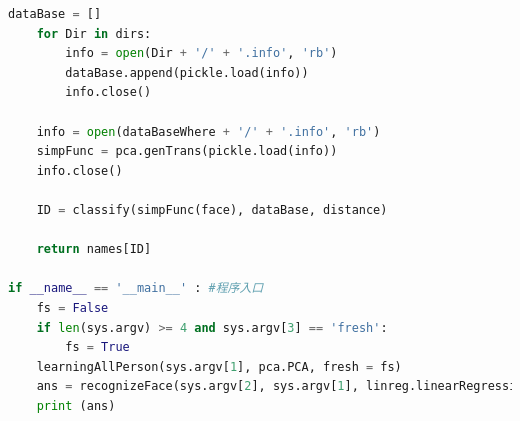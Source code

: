 \documentclass[fleqn,10pt]{SelfArx} %
\begin{document}
\begin{lstlisting}[language=python]
    dataBase = []
    for Dir in dirs:
        info = open(Dir + '/' + '.info', 'rb')
        dataBase.append(pickle.load(info))
        info.close()

    info = open(dataBaseWhere + '/' + '.info', 'rb')
    simpFunc = pca.genTrans(pickle.load(info))
    info.close()

    ID = classify(simpFunc(face), dataBase, distance)

    return names[ID]

if __name__ == '__main__' : #程序入口
    fs = False
    if len(sys.argv) >= 4 and sys.argv[3] == 'fresh':
        fs = True
    learningAllPerson(sys.argv[1], pca.PCA, fresh = fs)
    ans = recognizeFace(sys.argv[2], sys.argv[1], linreg.linearRegression)
    print (ans)
\end{lstlisting}
\end{document}
